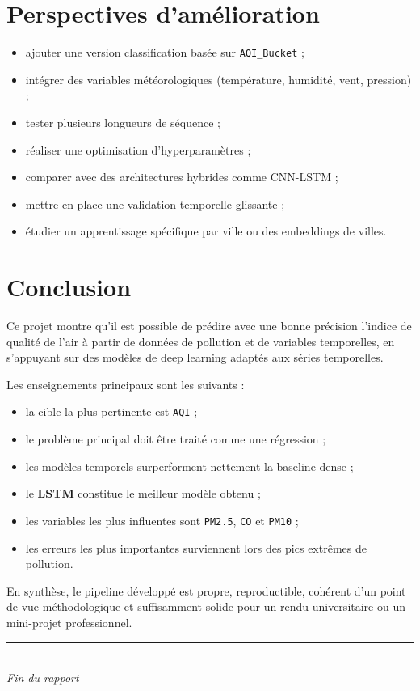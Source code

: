 \documentclass[11pt,a4paper]{article}
\newcommand{\aqi}{\texttt{AQI}}
\newcommand{\aqibucket}{\texttt{AQI\_Bucket}}
\begin{document}
\section{Perspectives d'amélioration}

\begin{itemize}
    \item ajouter une version classification basée sur \aqibucket{} ;
    \item intégrer des variables météorologiques (température, humidité, vent, pression) ;
    \item tester plusieurs longueurs de séquence ;
    \item réaliser une optimisation d'hyperparamètres ;
    \item comparer avec des architectures hybrides comme CNN-LSTM ;
    \item mettre en place une validation temporelle glissante ;
    \item étudier un apprentissage spécifique par ville ou des embeddings de villes.
\end{itemize}

\section{Conclusion}
Ce projet montre qu'il est possible de prédire avec une bonne précision l'indice de qualité de l'air à partir de données de pollution
et de variables temporelles, en s'appuyant sur des modèles de deep learning adaptés aux séries temporelles.

Les enseignements principaux sont les suivants :

\begin{itemize}
    \item la cible la plus pertinente est \aqi{} ;
    \item le problème principal doit être traité comme une régression ;
    \item les modèles temporels surperforment nettement la baseline dense ;
    \item le \textbf{LSTM} constitue le meilleur modèle obtenu ;
    \item les variables les plus influentes sont \texttt{PM2.5}, \texttt{CO} et \texttt{PM10} ;
    \item les erreurs les plus importantes surviennent lors des pics extrêmes de pollution.
\end{itemize}

En synthèse, le pipeline développé est propre, reproductible, cohérent d'un point de vue méthodologique
et suffisamment solide pour un rendu universitaire ou un mini-projet professionnel.

\vfill
\begin{center}
\textcolor{primary}{\rule{0.55\textwidth}{0.6pt}}\\[0.3cm]
\textit{Fin du rapport}
\end{center}
\end{document}
